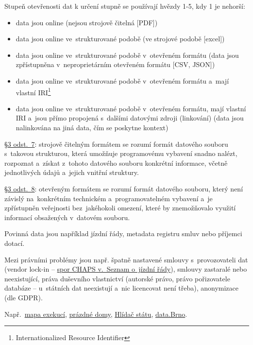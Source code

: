 Stupeň otevřenosti dat k určení stupně se používají hvězdy 1-5, kdy 1 je nehorší:

\begin{itemize}
    \item data jsou online (nejsou strojově čitelná [PDF])
    \item data jsou online ve~strukturované podobě (ve strojové podobě [excel])
    \item data jsou online ve~strukturované podobě v~otevřeném formátu (data jsou zpřístupněna v~neproprietárním otevřeném formátu [CSV, JSON])
    \item data jsou online ve~strukturované podobě v~otevřeném formátu a~mají vlastní IRI\footnote{Internationalized Resource Identifier}
    \item data jsou online ve~strukturované podobě v~otevřeném formátu, mají vlastní IRI a~jsou přímo propojená s~dalšími datovými zdroji (linkování) (data jsou nalinkována na jiná data, čím se poskytne kontext)
\end{itemize}

\href{https://www.zakonyprolidi.cz/cs/1999-106#p3-7}{§3 odst.~7}: strojově čitelným formátem se rozumí formát datového souboru s~takovou strukturou, která umožňuje programovému vybavení snadno nalézt, rozpoznat a~získat z~tohoto datového souboru konkrétní informace, včetně jednotlivých údajů a~jejich vnitřní struktury.

\href{https://www.zakonyprolidi.cz/cs/1999-106#p3-8}{§3 odst.~8}: otevřeným formátem se rozumí formát datového souboru, který není závislý na~konkrétním technickém a~programovatelném vybavení a~je zpřístupněn veřejnosti bez~jakéhokoli omezení, které by znemožňovalo využití informací obsažených v~datovém souboru.

Povinná data jsou například jízdní řády, metadata registru smluv nebo příjemci dotací.

Mezi právními problémy jsou např. špatně nastavené smlouvy s~provozovateli dat (vendor lock-in -- \href{http://ictjudikatura.law.muni.cz/wiki/6_As_38/2015_-_51_-_\%C5\%BD\%C3\%A1dost_o_specifick\%C3\%BD_form\%C3\%A1t_informac\%C3\%AD_(CHAPS)}{spor CHAPS v.~Seznam o~jízdní řády}), smlouvy zastaralé nebo neexistující, práva duševního vlastnictví (autorské právo, právo pořizovatele databáze -- u~státních dat neexistují a~nic licencovat není třeba), anonymizace (dle GDPR).

Např.~\href{https://mapaexekuci.cz}{mapa exekucí}, \href{https://prazdnedomy.cz}{prázdné domy}, \href{https://hlidacstatu.cz}{Hlídač státu}, \href{https://data.brno.cz}{data.Brno}.
